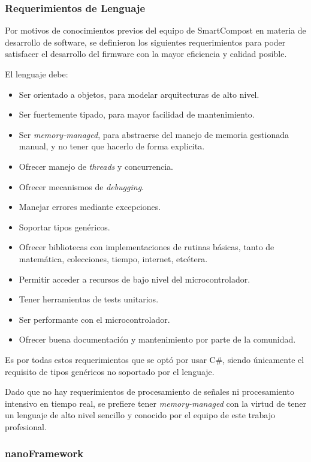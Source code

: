 \subsubsection{Requerimientos de Lenguaje}

Por motivos de conocimientos previos del equipo de SmartCompost en materia de desarrollo de software, se definieron los siguientes requerimientos para poder satisfacer el desarrollo del firmware con la mayor eficiencia y calidad posible.

El lenguaje debe:
\begin{itemize}
    \item Ser orientado a objetos, para modelar arquitecturas de alto nivel.
    \item Ser fuertemente tipado, para mayor facilidad de mantenimiento.
    \item Ser \textit{memory-managed}, para abstraerse del manejo de memoria gestionada manual, y no tener que hacerlo de forma explicita.
    \item Ofrecer manejo de \textit{threads} y concurrencia.
    \item Ofrecer mecanismos de \textit{debugging}.
    \item Manejar errores mediante excepciones.
    \item Soportar tipos genéricos.
    \item Ofrecer bibliotecas con implementaciones de rutinas básicas, tanto de matemática, colecciones, tiempo, internet, etcétera.
    \item Permitir acceder a recursos de bajo nivel del microcontrolador.
    \item Tener herramientas de tests unitarios.
    \item Ser performante con el microcontrolador.
    \item Ofrecer buena documentación y mantenimiento por parte de la comunidad.
\end{itemize}

Es por todas estos requerimientos que se optó por usar C\#, siendo únicamente el requisito de tipos genéricos no soportado por el lenguaje.

Dado que no hay requerimientos de procesamiento de señales ni procesamiento intensivo en tiempo real, se prefiere tener \textit{memory-managed} con la virtud de tener un lenguaje de alto nivel sencillo y conocido por el equipo de este trabajo profesional.

\subsubsection{nanoFramework}

